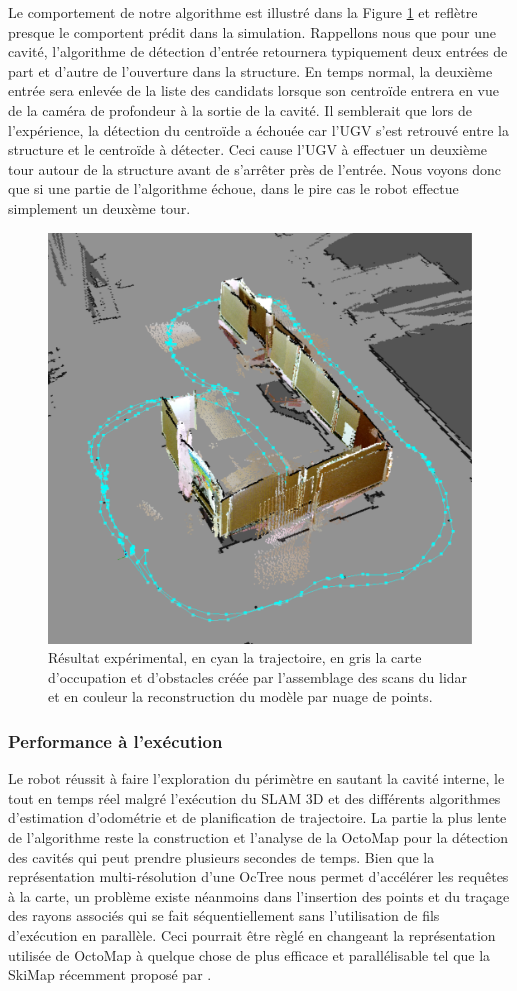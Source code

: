 Le comportement de notre algorithme est illustré dans la Figure \ref{fig:exp_angled_view} et reflètre presque le comportent prédit dans la simulation. Rappellons nous que pour une cavité, l'algorithme de détection d'entrée retournera typiquement deux entrées de part et d'autre de l'ouverture dans la structure. En temps normal, la deuxième entrée sera enlevée de la liste des candidats lorsque son centroïde entrera en vue de la caméra de profondeur à la sortie de la cavité. Il semblerait que lors de l'expérience, la détection du centroïde a échouée car l'UGV s'est retrouvé entre la structure et le centroïde à détecter. Ceci cause l'UGV à effectuer un deuxième tour autour de la structure avant de s'arrêter près de l'entrée. Nous voyons donc que si une partie de l'algorithme échoue, dans le pire cas le robot effectue simplement un deuxème tour.

\begin{figure}[!ht]
  \centering
  \includegraphics[width=0.5\linewidth]{images/exp_angled_view}
  \caption{Résultat expérimental, en cyan la trajectoire, en gris la carte d'occupation et d'obstacles créée par l'assemblage des scans du lidar et en couleur la reconstruction du modèle par nuage de points.}
  \label{fig:exp_angled_view}
\end{figure}

\subsubsection{Performance à l'exécution}

Le robot réussit à faire l'exploration du périmètre en sautant la cavité interne, le tout en temps réel malgré l'exécution du SLAM 3D et des différents algorithmes d'estimation d'odométrie et de planification de trajectoire. La partie la plus lente de l'algorithme reste la construction et l'analyse de la OctoMap pour la détection des cavités qui peut prendre plusieurs secondes de temps. Bien que la représentation multi-résolution d'une OcTree nous permet d'accélérer les requêtes à la carte, un problème existe néanmoins dans l'insertion des points et du traçage des rayons associés qui se fait séquentiellement sans l'utilisation de fils d'exécution en parallèle. Ceci pourrait être règlé en changeant la représentation utilisée de OctoMap à quelque chose de plus efficace et parallélisable tel que la SkiMap récemment proposé par \citep{Gregorio2017}.

